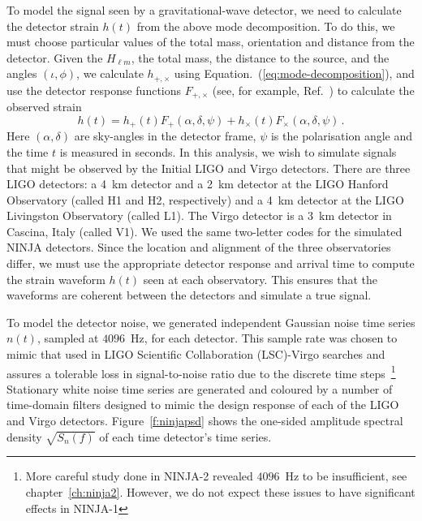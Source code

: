 To model the signal seen by a gravitational-wave detector, we need to
calculate the detector strain $h(t)$ from the above mode
decomposition. To do this, we must choose particular values of the
total mass, orientation and distance from the detector.  Given the
$H_{\ell m}$, the total mass, the distance to the source, and the
angles $(\iota,\phi)$, we calculate $h_{+,\times}$ using
Equation.~(\ref{eq:mode-decomposition}), and use the detector response
functions $F_{+,\times}$ (see, for example, Ref.~\cite{thorne.k:1987})
to calculate the observed strain
\begin{equation}
  h(t) = h_+(t) F_+(\alpha,\delta,\psi) + h_\times(t) F_\times(\alpha,\delta,\psi)\,.
\end{equation} %
%
Here $(\alpha,\delta)$ are sky-angles in the detector frame, $\psi$ is
the polarisation angle and the time $t$ is measured in seconds. In
this analysis, we wish to simulate signals that might be observed by
the Initial LIGO and Virgo detectors. There are three LIGO detectors:
a 4~km detector and a 2~km detector at the LIGO Hanford Observatory
(called H1 and H2, respectively) and a 4~km detector at the LIGO
Livingston Observatory (called L1). The Virgo detector is a 3~km
detector in Cascina, Italy (called V1). We used the same two-letter
codes for the simulated NINJA detectors.  Since the location and
alignment of the three observatories differ, we must use the
appropriate detector response and arrival time to compute the strain
waveform $h(t)$ seen at each observatory. This ensures that the
waveforms are coherent between the detectors and simulate a true
signal.

To model the detector noise, we generated independent Gaussian noise
time series $n(t)$, sampled at $4096$~Hz, for each detector. This
sample rate was chosen to mimic that used in LIGO Scientific
Collaboration (LSC)-Virgo searches and assures a tolerable loss in
signal-to-noise ratio due to the discrete time steps~\footnote{More
careful study done in NINJA-2 revealed $4096$~Hz to be insufficient,
see chapter~\ref{ch:ninja2}.  However, we do not expect these issues
to have significant effects in NINJA-1} Stationary white noise time
series are generated and coloured by a number of time-domain filters
designed to mimic  the design response of each of the LIGO and Virgo
detectors. Figure~\ref{f:ninjapsd} shows the one-sided amplitude
spectral density $\sqrt{S_n(f)}$ of each time detector's time series.

